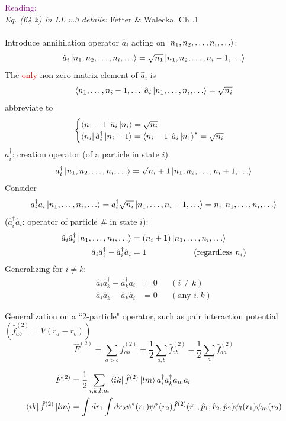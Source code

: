 \documentclass[10pt]{article}
\newcommand{\smallspace}{\hspace{2cm}}
\begin{document}
\noindent \textcolor{purple}{Reading:}\\
\noindent \textit{Eq. (64.2) in LL v.3} \smallspace \textit{details:} Fetter \& Walecka, Ch .1\\ \\
\noindent Introduce annihilation operator $\hat a_i$ acting on $\ket{n_1, n_2,\dots,n_i, \dots}$:
$$
\hat a_i\ket{n_1, n_2, \dots,n_i,\dots} = \sqrt{n_1}\ket{n_1, n_2, \dots, n_i-1,\dots}
$$
The \textcolor{red}{only} non-zero matrix element of $\hat a_i$ is
$$
\bra{n_1, \dots, n_i-1,\dots}\hat a_i \ket{n_1, \dots, n_i, \dots} = \sqrt{n_i}
$$
abbreviate to
\[
\begin{cases}
    \bra{n_1-1}\hat a_i \ket{n_i} = \sqrt{n_i} \\
    \bra{n_i}\hat a_i^\dagger \ket{n_i-1} = \bra{n_i-1}\hat a_i\ket{n_1}^\ast = \sqrt{n_i}
\end{cases}
\]
$a_i^\dagger$: creation operator (of a particle in state $i$)
$$
a_i^\dagger \ket{n_1, n_2, \dots, n_i, \dots} = \sqrt{n_i+1}\ket{n_1, n_2, \dots, n_i+1, \dots}
$$
Consider
$$
a_i^\dagger a_i \ket{n_1, \dots, n_i, \dots} = a_i^\dagger \sqrt{n_i} \ket{n_1, \dots, n_i-1,\dots} = n_i \ket{n_1,\dots,n_i,\dots}
$$
($\hat a_i^\dagger \hat a_i$: operator of particle \# in state $i$):
\begin{align*}
    \hat a_i\hat a_i^\dagger\ket{n_1, \dots, n_i, \dots} &= (n_i+1) \ket{n_1, \dots, n_i, \dots} \\
    \hat a_i \hat a_i^\dagger - \hat a_i^\dagger \hat a_i &= 1 \smallspace \text{(regardless $n_i$)}
\end{align*}
Generalizing for $i\neq k$:
\begin{align*}
    \hat a_i \hat a_k^\dagger - \hat a_k^\dagger a_i &= 0  & &(i\neq k)\\
    \hat a_i \hat a_k - \hat a_k \hat a_i & =0 & &(\text{any } i, k)
\end{align*}
\begin{center}
    \tcbox[nobeforeafter, colframe = red, colback = white]{\([\hat a_i, \hat a_k^\dagger] = \delta_{ik}, \smallspace [\hat a_i, \hat a_k] = 0 \smallspace (\forall \ i,k)\)}
\end{center}
Generalization on a ``2-particle" operator, such as pair interaction potential $(\hat f^{(2)}_{ab} = V(r_a-r_b))$
$$
\hat F^{(2)} = \sum_{a>b}\hat f_{ab}^{(2)} = \frac{1}{2}\sum_{a,b} \hat f_{ab}^{(2)} - \frac{1}{2}\sum_a \hat f_{aa}^{(2)}
$$
\begin{tcolorbox}[colframe = red, colback = white]
    \begin{align*}
       \hat F^{(2)}&= \frac{1}{2}\sum_{i,k,l,m} \bra{ik}\hat f^{(2)} \ket{lm} a_i^\dagger a_k^\dagger a_m a_l \\
        \bra{ik}\hat f^{(2)} \ket{lm} &= \int dr_1 \int dr_2 \psi^\ast(r_1)\psi^\ast(r_2) \hat f^{(2)}(\hat r_1, \hat p_1; \hat r_2, \hat p_2) \psi_l(r_1)\psi_m(r_2)
    \end{align*}
\end{tcolorbox}
\end{document}
